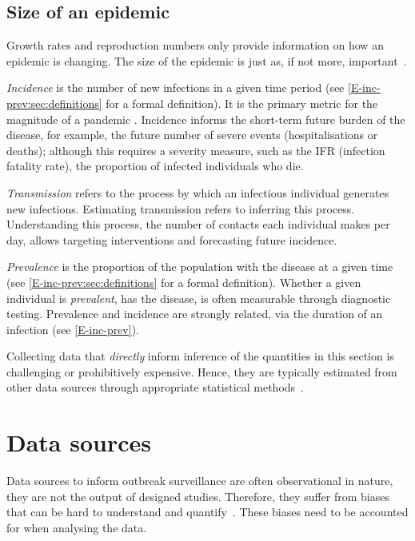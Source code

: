 \documentclass[thesis.tex]{subfiles}
\begin{document}
\subsection{Size of an epidemic}

Growth rates and reproduction numbers only provide information on how an epidemic is changing.
The size of the epidemic is just as, if not more, important~\autocite{pellisEstimation}.

\emph{Incidence} is the number of new infections in a given time period (see \cref{E-inc-prev:sec:definitions} for a formal definition).
It is the primary metric for the magnitude of a pandemic .
Incidence informs the short-term future burden of the disease, for example, the future number of severe events (hospitalisations or deaths); although this requires a severity measure, such as the IFR (infection fatality rate), the proportion of infected individuals who die.

\emph{Transmission} refers to the process by which an infectious individual generates new infections.
Estimating transmission refers to inferring this process. Understanding this process, \eg the number of contacts each individual makes per day, allows targeting interventions and forecasting future incidence.

\emph{Prevalence} is the proportion of the population with the disease at a given time (see \cref{E-inc-prev:sec:definitions} for a formal definition).
Whether a given individual is \emph{prevalent}, \ie has the disease, is often measurable through diagnostic testing.
Prevalence and incidence are strongly related, via the duration of an infection (see \cref{E-inc-prev}).


Collecting data that \emph{directly} inform inference of the quantities in this section is challenging or prohibitively expensive.
Hence, they are typically estimated from other data sources through appropriate statistical methods~\autocite{heldHandbook,oneillIntroduction}.

\section{Data sources}

Data sources to inform outbreak surveillance are often observational in nature, \ie they are not the output of designed studies.
Therefore, they suffer from biases that can be hard to understand and quantify~\autocite{shadboltChallenges}.
These biases need to be accounted for when analysing the data.
\end{document}
